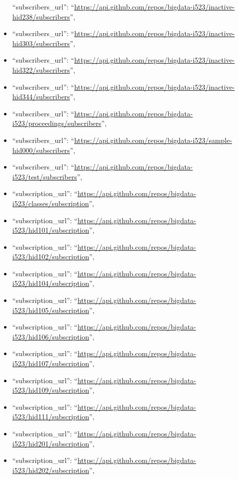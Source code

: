 \begin{itemize}
  ``subscribers\_url'':
  ``\url{https://api.github.com/repos/bigdata-i523/inactive-hid238/subscribers}'',
\item
  ``subscribers\_url'':
  ``\url{https://api.github.com/repos/bigdata-i523/inactive-hid303/subscribers}'',
\item
  ``subscribers\_url'':
  ``\url{https://api.github.com/repos/bigdata-i523/inactive-hid322/subscribers}'',
\item
  ``subscribers\_url'':
  ``\url{https://api.github.com/repos/bigdata-i523/inactive-hid344/subscribers}'',
\item
  ``subscribers\_url'':
  ``\url{https://api.github.com/repos/bigdata-i523/proceedings/subscribers}'',
\item
  ``subscribers\_url'':
  ``\url{https://api.github.com/repos/bigdata-i523/sample-hid000/subscribers}'',
\item
  ``subscribers\_url'':
  ``\url{https://api.github.com/repos/bigdata-i523/test/subscribers}'',
\item
  ``subscription\_url'':
  ``\url{https://api.github.com/repos/bigdata-i523/classes/subscription}'',
\item
  ``subscription\_url'':
  ``\url{https://api.github.com/repos/bigdata-i523/hid101/subscription}'',
\item
  ``subscription\_url'':
  ``\url{https://api.github.com/repos/bigdata-i523/hid102/subscription}'',
\item
  ``subscription\_url'':
  ``\url{https://api.github.com/repos/bigdata-i523/hid104/subscription}'',
\item
  ``subscription\_url'':
  ``\url{https://api.github.com/repos/bigdata-i523/hid105/subscription}'',
\item
  ``subscription\_url'':
  ``\url{https://api.github.com/repos/bigdata-i523/hid106/subscription}'',
\item
  ``subscription\_url'':
  ``\url{https://api.github.com/repos/bigdata-i523/hid107/subscription}'',
\item
  ``subscription\_url'':
  ``\url{https://api.github.com/repos/bigdata-i523/hid109/subscription}'',
\item
  ``subscription\_url'':
  ``\url{https://api.github.com/repos/bigdata-i523/hid111/subscription}'',
\item
  ``subscription\_url'':
  ``\url{https://api.github.com/repos/bigdata-i523/hid201/subscription}'',
\item
  ``subscription\_url'':
  ``\url{https://api.github.com/repos/bigdata-i523/hid202/subscription}'',

\end{itemize}
